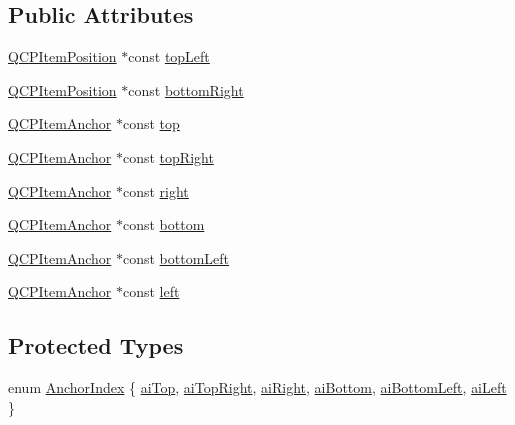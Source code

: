 \subsection*{Public Attributes}
\begin{DoxyCompactItemize}
\item 
\mbox{\hyperlink{class_q_c_p_item_position}{Q\+C\+P\+Item\+Position}} $\ast$const \mbox{\hyperlink{class_q_c_p_item_pixmap_a43c281ef6ad46f3cf04f365289abe51a}{top\+Left}}
\item 
\mbox{\hyperlink{class_q_c_p_item_position}{Q\+C\+P\+Item\+Position}} $\ast$const \mbox{\hyperlink{class_q_c_p_item_pixmap_abcc38063f9502b876bf6615c45cc0994}{bottom\+Right}}
\item 
\mbox{\hyperlink{class_q_c_p_item_anchor}{Q\+C\+P\+Item\+Anchor}} $\ast$const \mbox{\hyperlink{class_q_c_p_item_pixmap_af7a156590b1d59ab21b453c430c56a7c}{top}}
\item 
\mbox{\hyperlink{class_q_c_p_item_anchor}{Q\+C\+P\+Item\+Anchor}} $\ast$const \mbox{\hyperlink{class_q_c_p_item_pixmap_a72eabd0010be41a4ec1b22aa983d2aa1}{top\+Right}}
\item 
\mbox{\hyperlink{class_q_c_p_item_anchor}{Q\+C\+P\+Item\+Anchor}} $\ast$const \mbox{\hyperlink{class_q_c_p_item_pixmap_ac9c0fd231f9e285765978a05d13f8280}{right}}
\item 
\mbox{\hyperlink{class_q_c_p_item_anchor}{Q\+C\+P\+Item\+Anchor}} $\ast$const \mbox{\hyperlink{class_q_c_p_item_pixmap_ad7da77f530868e846151eff8a28fb948}{bottom}}
\item 
\mbox{\hyperlink{class_q_c_p_item_anchor}{Q\+C\+P\+Item\+Anchor}} $\ast$const \mbox{\hyperlink{class_q_c_p_item_pixmap_a01943e569233382b3627e24636b0fff2}{bottom\+Left}}
\item 
\mbox{\hyperlink{class_q_c_p_item_anchor}{Q\+C\+P\+Item\+Anchor}} $\ast$const \mbox{\hyperlink{class_q_c_p_item_pixmap_a8c85fcb8cb8ce292859a0499d16539b1}{left}}
\end{DoxyCompactItemize}
\subsection*{Protected Types}
\begin{DoxyCompactItemize}
\item 
enum \mbox{\hyperlink{class_q_c_p_item_pixmap_a0ea7f65edb7395e02de521915f221174}{Anchor\+Index}} \{ \newline
\mbox{\hyperlink{class_q_c_p_item_pixmap_a0ea7f65edb7395e02de521915f221174a90e523ebaed7921ca90cf1b08944ece5}{ai\+Top}}, 
\mbox{\hyperlink{class_q_c_p_item_pixmap_a0ea7f65edb7395e02de521915f221174a33c256cdec46fa1587534fcd6e776799}{ai\+Top\+Right}}, 
\mbox{\hyperlink{class_q_c_p_item_pixmap_a0ea7f65edb7395e02de521915f221174ab22d91dae59c0d4a65416a0d677b2d05}{ai\+Right}}, 
\mbox{\hyperlink{class_q_c_p_item_pixmap_a0ea7f65edb7395e02de521915f221174a04b5e041b4dd0def2b60c5cfea2bc1a4}{ai\+Bottom}}, 
\newline
\mbox{\hyperlink{class_q_c_p_item_pixmap_a0ea7f65edb7395e02de521915f221174ae14886b381136898e37e89af5046a1cc}{ai\+Bottom\+Left}}, 
\mbox{\hyperlink{class_q_c_p_item_pixmap_a0ea7f65edb7395e02de521915f221174a9efe71239b9409ebe1c2813a37807f2a}{ai\+Left}}
 \}
\end{DoxyCompactItemize}
